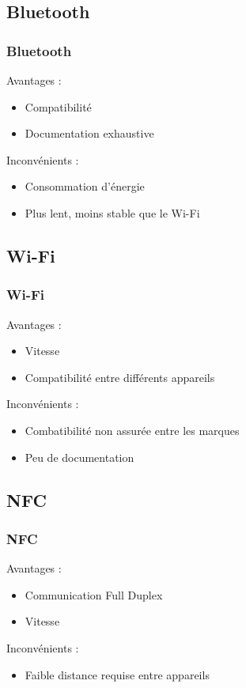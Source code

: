 \documentclass{beamer}
\begin{document}
      \subsection{Bluetooth}
      \begin{frame}
	  \frametitle{Bluetooth}
	  \begin{block}{Avantages :}
	  \begin{itemize}
	   \item Compatibilité
	   \item Documentation exhaustive
	  \end{itemize}
	  \end{block}
	  \begin{block}{Inconvénients :}
	  \begin{itemize}
	   \item Consommation d'énergie
	   \item Plus lent, moins stable que le Wi-Fi
	  \end{itemize}
	  \end{block}
      \end{frame}
      \subsection{Wi-Fi}
      \begin{frame}
	  \frametitle{Wi-Fi}
	  \begin{block}{Avantages :}
	  \begin{itemize}
	   \item Vitesse
	   \item Compatibilité entre différents appareils
	  \end{itemize}
	  \end{block}
	  \begin{block}{Inconvénients :}
	  \begin{itemize}
	   \item Combatibilité non assurée entre les marques
	   \item Peu de documentation
	  \end{itemize}
	  \end{block}
      \end{frame}
      \subsection{NFC}
      \begin{frame}
	  \frametitle{NFC}
	  \begin{block}{Avantages :}
	  \begin{itemize}
	   \item Communication Full Duplex
	   \item Vitesse
	  \end{itemize}
	  \end{block}
	  \begin{block}{Inconvénients :}
	  \begin{itemize}
	   \item Faible distance requise entre appareils
	  \end{itemize}
	  \end{block}
      \end{frame}
\end{document}
